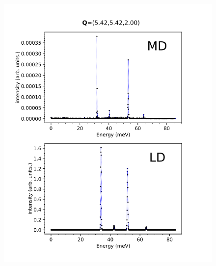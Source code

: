 \documentclass[prl,preprint,aps,superscriptaddress,floatfix]{revtex4-2}
\begin{document}
\begin{figure}
  \includegraphics[width=\linewidth]{./figs/const_Q_validation.png}
        \caption{}
\label{fig:const_Q_validation}
\end{figure}



\end{document}
